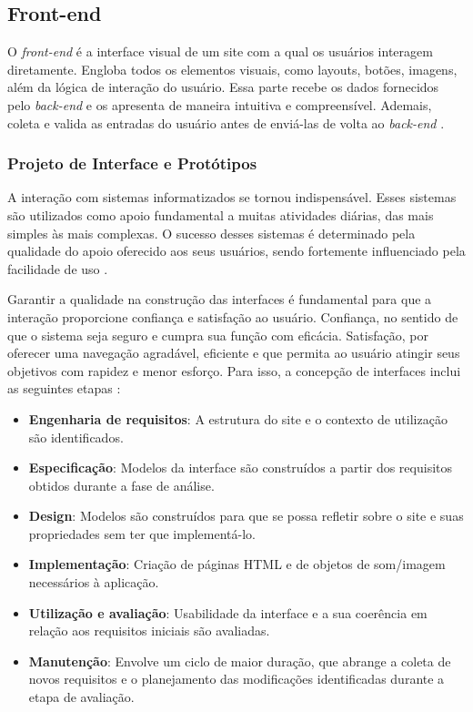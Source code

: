 \subsection{Front-end}

O \textit{front-end} é a interface visual de um site com a qual os usuários interagem diretamente. Engloba todos os elementos visuais, como layouts, botões, imagens, além da lógica de interação do usuário. Essa parte recebe os dados fornecidos pelo \textit{back-end} e os apresenta de maneira intuitiva e compreensível. Ademais, coleta e valida as entradas do usuário antes de enviá-las de volta ao \textit{back-end} \cite{garcia2024plataforma}.

\subsubsection{Projeto de Interface e Protótipos}

A interação com sistemas informatizados se tornou indispensável. Esses sistemas são utilizados como apoio fundamental a muitas atividades diárias, das mais simples às mais complexas. O sucesso desses sistemas é determinado pela qualidade do apoio oferecido aos seus usuários, sendo fortemente influenciado pela facilidade de uso \cite{miletto2014desenvolvimento}.

Garantir a qualidade na construção das interfaces é fundamental para que a interação proporcione confiança e satisfação ao usuário. Confiança, no sentido de que o sistema seja seguro e cumpra sua função com eficácia. Satisfação, por oferecer uma navegação agradável, eficiente e que permita ao usuário atingir seus objetivos com rapidez e menor esforço. Para isso, a concepção de interfaces inclui as seguintes etapas \cite{miletto2014desenvolvimento}:
\begin{itemize}
    \item \textbf{Engenharia de requisitos}: A estrutura do site e o contexto de utilização são identificados.
    \item \textbf{Especificação}: Modelos da interface são construídos a partir dos requisitos obtidos durante a fase de análise.
    \item \textbf{Design}: Modelos são construídos para que se possa refletir sobre o site e suas propriedades sem ter que implementá-lo.
    \item \textbf{Implementação}: Criação de páginas HTML e de objetos de som/imagem necessários à aplicação.
    \item \textbf{Utilização e avaliação}: Usabilidade da interface e a sua coerência em relação aos requisitos iniciais são avaliadas.
    \item \textbf{Manutenção}: Envolve um ciclo de maior duração, que abrange a coleta de novos requisitos e o planejamento das modificações identificadas durante a etapa de avaliação.
\end{itemize}

